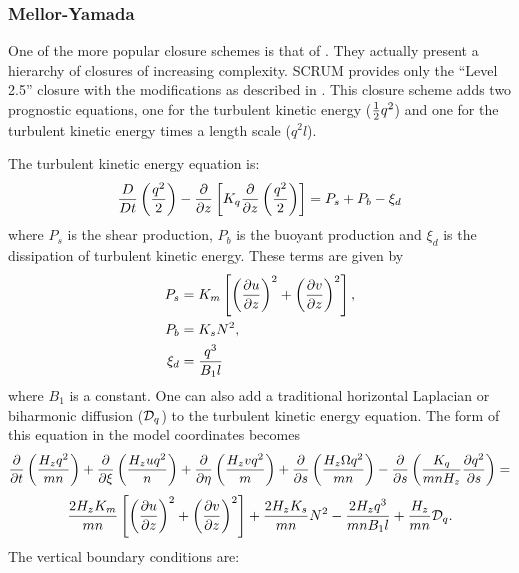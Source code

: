 \subsubsection{Mellor-Yamada}
One of the more popular closure schemes is that of 
\citet{Mellor74, Mellor82}. They actually present a hierarchy of
closures of increasing complexity. SCRUM provides only the
``Level 2.5'' closure with the \citet{Galperin88}
modifications as described in \citet{Allen95}.
This closure scheme adds two prognostic equations, one
for the turbulent kinetic energy (${1 \over 2} q^2$) and one for the
turbulent kinetic energy times a length scale ($q^2l$).

The turbulent kinetic energy equation is:
\begin{equation}
  {D \over Dt} \left( {q^2 \over 2} \right) -
  {\partial \over \partial z} \left[ K_q {\partial \over \partial z} 
  \left( {q^2 \over 2} \right) \right] = P_s + P_b - \xi_d
\end{equation}
where $P_s$ is the shear production, $P_b$ is the buoyant production
and $\xi_d$ is the dissipation of turbulent kinetic energy. 
These terms are given by
\begin{align}
   P_s &= K_m \left[ \left( {\partial u \over \partial z }\right)^2 +
   \left( {\partial v \over \partial z} \right)^2 \right],  \\
   P_b &= K_s N^2, \\
   \xi_d &= {q^3 \over B_1 l}
\end{align}
where $B_1$ is a constant.
One can also add a traditional horizontal Laplacian or biharmonic
diffusion (${\cal D}_q$) to the turbulent kinetic energy equation.
The form of this equation in the model coordinates becomes
{\samepage
\[
  {\partial \over \partial t} \left( {H_z q^2 \over mn} \right) +
  {\partial \over \partial \xi} \left( {H_z u q^2 \over n} \right) +
  {\partial \over \partial \eta} \left( {H_z v q^2 \over m} \right) +
  {\partial \over \partial s} \left( {H_z \Omega q^2 \over mn} \right) -
  {\partial \over \partial s} \left( {K_q \over mnH_z}
  {\partial q^2 \over \partial s} \right) =
\]
\begin{equation}
  {2H_z K_m \over mn} \left[ \left({\partial u \over \partial z}
  \right)^2 + \left( {\partial v \over \partial z} \right)^2 \right] +
  {2H_z K_s \over mn} N^2 - {2H_z q^3 \over mnB_1 l} +
  {H_z \over mn} {\cal D}_q .
\end{equation}
}
The vertical boundary conditions are:
